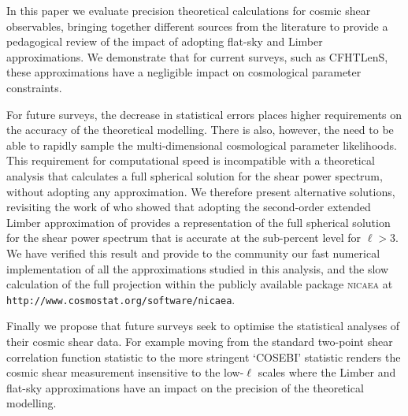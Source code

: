 In this paper we evaluate precision theoretical calculations for cosmic shear
observables, bringing together different sources from the literature to provide
a pedagogical review of the impact of adopting flat-sky and Limber
approximations.  We demonstrate that for current surveys, such as CFHTLenS,
these approximations have a negligible impact on cosmological parameter
constraints.

For future surveys, the decrease in statistical errors places higher
requirements on the accuracy of the theoretical modelling.    There is also,
however, the need to be able to rapidly sample the multi-dimensional
cosmological parameter likelihoods.  This requirement for computational speed
is incompatible with a theoretical analysis that calculates a full spherical
solution for the shear power spectrum, without adopting any approximation.  We
therefore present alternative solutions, revisiting the work of
\citet{2012PhRvD..86b3001B} who showed that adopting the second-order extended
Limber approximation of \citet{2008PhRvD..78l3506L} provides a representation
of the full spherical solution for the shear power spectrum that is accurate at
the sub-percent level for $\ell > 3$.    We have verified this result and
provide to the community our fast numerical implementation of all the
approximations studied in this analysis, and the slow calculation of the full
projection within the publicly available package \textsc{nicaea} at
\texttt{http://www.cosmostat.org/software/nicaea}.

Finally we propose that future surveys seek to optimise the statistical
analyses of their cosmic shear data.  For example moving from the standard
two-point shear correlation function statistic to the more stringent `COSEBI'
statistic \citep{COSEBIs} renders the cosmic shear measurement insensitive to
the low-$\ell$ scales where the Limber and flat-sky approximations have an
impact on the precision of the theoretical modelling.  


